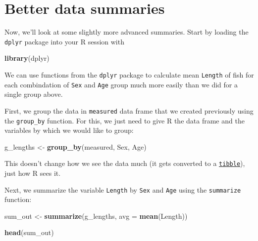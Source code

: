\documentclass[
]{book}
\newenvironment{Shaded}{\begin{snugshade}}{\end{snugshade}}
\newcommand{\DataTypeTok}[1]{\textcolor[rgb]{0.13,0.29,0.53}{#1}}
\newcommand{\KeywordTok}[1]{\textcolor[rgb]{0.13,0.29,0.53}{\textbf{#1}}}
\newcommand{\NormalTok}[1]{#1}
\newcommand{\StringTok}[1]{\textcolor[rgb]{0.31,0.60,0.02}{#1}}
\begin{document}
\hypertarget{better-data-summaries}{%
\section{Better data summaries}\label{better-data-summaries}}

Now, we'll look at some slightly more advanced summaries. Start by loading the \texttt{dplyr} package into your R session with

\begin{Shaded}
\begin{Highlighting}[]
\KeywordTok{library}\NormalTok{(dplyr)}
\end{Highlighting}
\end{Shaded}

We can use functions from the \texttt{dplyr} package to calculate mean \texttt{Length} of fish for each combindation of \texttt{Sex} and \texttt{Age} group much more easily than we did for a single group above.

First, we group the data in \texttt{measured} data frame that we created previously using the \texttt{group\_by} function. For this, we just need to give R the data frame and the variables by which we would like to group:

\begin{Shaded}
\begin{Highlighting}[]
\NormalTok{g_lengths <-}\StringTok{ }\KeywordTok{group_by}\NormalTok{(measured, Sex, Age)}
\end{Highlighting}
\end{Shaded}

This doesn't change how we see the data much (it gets converted to a \href{https://tibble.tidyverse.org/\#:~:text=A\%20tibble\%2C\%20or\%20tbl_df\%20\%2C\%20is,modern\%20reimagining\%20of\%20the\%20data.\&text=Tibbles\%20are\%20data.,a\%20variable\%20does\%20not\%20exist}{\texttt{tibble}}), just how R sees it.

Next, we summarize the variable \texttt{Length} by \texttt{Sex} and \texttt{Age} using the \texttt{summarize} function:

\begin{Shaded}
\begin{Highlighting}[]
\NormalTok{sum_out <-}\StringTok{ }\KeywordTok{summarize}\NormalTok{(g_lengths, }\DataTypeTok{avg =} \KeywordTok{mean}\NormalTok{(Length))}

\KeywordTok{head}\NormalTok{(sum_out)}
\end{Highlighting}
\end{Shaded}
\end{document}
